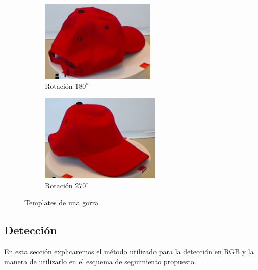\begin{figure}
	\begin{subfigure}[b]{0.25\textwidth}
		\includegraphics[width=\textwidth]{img/templates/180_crop.png}
		\caption{Rotación $180^{\circ}$}
	\end{subfigure}
	\quad
	\begin{subfigure}[b]{0.25\textwidth}
		\includegraphics[width=\textwidth]{img/templates/270_crop.png}
		\caption{Rotación $270^{\circ}$}
	\end{subfigure}
	\caption{Templates de una gorra}
	\label{templates_objeto}
\end{figure}

\subsection{Detección}\label{deteccion_rgb}
En esta sección explicaremos el método utilizado para la detección en RGB y la manera de utilizarlo en el esquema de seguimiento propuesto.

